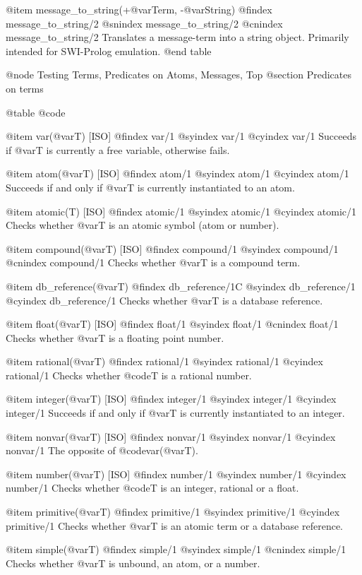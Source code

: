 {{{{@item message_to_string(+@var{Term}, -@var{String})
@findex message_to_string/2
@snindex message_to_string/2
@cnindex message_to_string/2 
Translates a message-term into a string object. Primarily intended for SWI-Prolog emulation.
@end table

@node Testing Terms, Predicates on Atoms, Messages, Top
@section Predicates on terms

@table @code

@item var(@var{T}) [ISO]
@findex var/1
@syindex var/1
@cyindex var/1
Succeeds if @var{T} is currently a free variable, otherwise fails. 

@item atom(@var{T}) [ISO]
@findex atom/1
@syindex atom/1
@cyindex atom/1
Succeeds if and only if @var{T} is currently instantiated to an  atom.

@item atomic(T) [ISO]
@findex atomic/1
@syindex atomic/1
@cyindex atomic/1
Checks whether @var{T} is an atomic symbol (atom or number).

@item compound(@var{T}) [ISO]
@findex compound/1
@syindex compound/1
@cnindex compound/1
Checks whether @var{T} is a compound term.

@item db_reference(@var{T})
@findex db_reference/1C
@syindex db_reference/1
@cyindex db_reference/1
Checks whether @var{T} is a database reference.

@item float(@var{T}) [ISO]
@findex float/1
@syindex float/1
@cnindex float/1
Checks whether @var{T} is a floating point number.

@item rational(@var{T})
@findex rational/1
@syindex rational/1
@cyindex rational/1
Checks whether @code{T} is a rational number.

@item integer(@var{T}) [ISO]
@findex integer/1
@syindex integer/1
@cyindex integer/1
Succeeds if and only if @var{T} is currently instantiated to an  integer.

@item nonvar(@var{T}) [ISO]
@findex nonvar/1
@syindex nonvar/1
@cyindex nonvar/1
The opposite of @code{var(@var{T})}.

@item number(@var{T}) [ISO]
@findex number/1
@syindex number/1
@cyindex number/1
Checks whether @code{T} is an integer, rational or a float.

@item primitive(@var{T})
@findex primitive/1
@syindex primitive/1
@cyindex primitive/1
Checks whether @var{T} is an atomic term or a database reference.

@item simple(@var{T})
@findex simple/1
@syindex simple/1
@cnindex simple/1
Checks whether @var{T} is unbound, an atom, or a number.

}}}}
